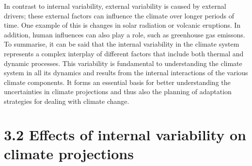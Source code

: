 \documentclass[
]{krantz}
\begin{document}
In contrast to internal variability, external variability is caused by external drivers; these external factors can influence the climate over longer periods of time. One example of this is changes in solar radiation or volcanic eruptions. In addition, human influences can also play a role, such as greenhouse gas emissons.
To summarise, it can be said that the internal variability in the climate system represents a complex interplay of different factors that include both thermal and dynamic processes. This variability is fundamental to understanding the climate system in all its dynamics and results from the internal interactions of the various climate components. It forms an essential basis for better understanding the uncertainties in climate projections and thus also the planning of adaptation strategies for dealing with climate change.

\section{3.2 Effects of internal variability on climate projections}\label{effects-of-internal-variability-on-climate-projections}
\end{document}
